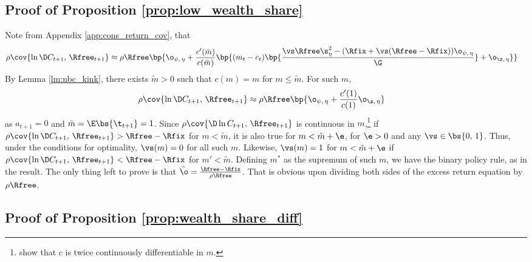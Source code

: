 \subsection{Proof of Proposition \ref{prop:low_wealth_share}}\label{pf:low_wealth_share}

Note from Appendix \ref{app:cons_return_cov}, that
\begin{align*}
    \rho\cov{\ln \D C_{t+1},\,\Rfree_{t+1}} &\approx \rho\Rfree\bp{\o_{\psi,\,\eta} + \frac{c'(\bar{m})}{c(\bar{m})}\bp{(m_t - c_t)\bp{\frac{\vs\Rfree\s_{\eta}^2 - (\Rfix + \vs(\Rfree - \Rfix))\o_{\psi,\,\eta}}{\G}} + \o_{\z,\,\eta}}}
\end{align*}
By Lemma \ref{lm:nbc_kink}, there exists $\tilde{m} > 0$ such that $c(m) = m$ for $m \leq \tilde{m}$. For such $m$,
\begin{align*}
    \rho\cov{\ln \D C_{t+1},\,\Rfree_{t+1}} &\approx \rho\Rfree\bp{\o_{\psi,\,\eta} + \frac{c'(1)}{c(1)}\o_{\z,\,\eta}}
\end{align*}
as $a_{t+1} = 0$ and $\bar{m} = \E\bs{\t_{t+1}} = 1$. Since $\rho\cov{\D\ln C_{t+1},\,\Rfree_{t+1}}$ is continuous in $m$,\footnote{\citet{Carroll2024b} show that $c$ is twice continuously differentiable in $m$.} if $\rho\cov{\ln \D C_{t+1},\,\Rfree_{t+1}} > \Rfree - \Rfix$ for $m < \tilde{m}$, it is also  true for $m < \tilde{m} + \e$, for $\e > 0$ and any $\vs \in \bs{0,\,1}$. Thus, under the conditions for optimality, $\vs(m) = 0$ for all such $m$. Likewise, $\vs(m) = 1$ for $m < \tilde{m} + \e$ if $\rho\cov{\ln \D C_{t+1},\,\Rfree_{t+1}} < \Rfree - \Rfix$ for $m' < \tilde{m}$. Defining $m^*$ as the supremum of such $m$, we have the binary policy rule, as in the result. The only thing left to prove is that $\tilde{\o} = \frac{\Rfree - \Rfix}{\rho\Rfree}$. That is obvious upon dividing both sides of the excess return equation by $\rho\Rfree$.

\subsection{Proof of Proposition \ref{prop:wealth_share_diff}}\label{pf:wealth_share_diff}



